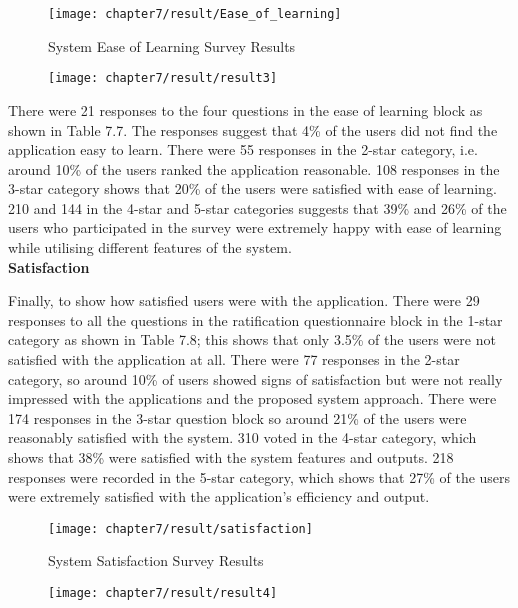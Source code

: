 \begin{figure}
\centering
\texttt{[image: chapter7/result/Ease\_of\_learning]}
\caption{System Ease of Learning Survey Results}
\end{figure}

\begin{figure}
\centering
\texttt{[image: chapter7/result/result3]}
\end{figure}

There were 21 responses to the four questions in the ease of learning block as shown in Table 7.7. The responses suggest that 4\% of the users did not find the application easy to learn. There were 55 responses in the 2-star category, i.e. around 10\% of the users ranked the application reasonable. 108 responses in the 3-star category shows that 20\% of the users were satisfied with ease of learning. 210 and 144 in the 4-star and 5-star categories suggests that 39\% and 26\% of the users who participated in the survey were extremely happy with ease of learning while utilising different features of the system.\\

\textbf{Satisfaction}

Finally, to show how satisfied users were with the application. There were 29 responses to all the questions in the ratification questionnaire block in the 1-star category as shown in Table 7.8; this shows that only 3.5\% of the users were not satisfied with the application at all. There were 77 responses in the 2-star category, so around 10\% of users showed signs of satisfaction but were not really impressed with the applications and the proposed system approach. There were 174 responses in the 3-star question block so around 21\% of the users were reasonably satisfied with the system. 310 voted in the 4-star category, which shows that 38\% were satisfied with the system features and outputs. 218 responses were recorded in the 5-star category, which shows that 27\% of the users were extremely satisfied with the application's efficiency and output. 

\begin{figure}
\centering
\texttt{[image: chapter7/result/satisfaction]}
\caption{System Satisfaction Survey Results}
\end{figure}

\begin{figure}
\centering
\texttt{[image: chapter7/result/result4]}
\end{figure}

